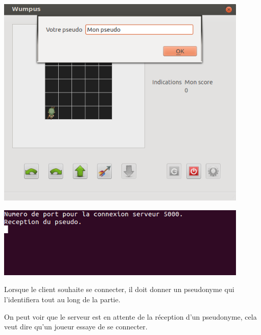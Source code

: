 \documentclass[a4paper,10pt]{article}
\begin{document}
		
		\begin{minipage}[t]{0.46\textwidth}
			\vspace{2pt}
			\centering
			\includegraphics[width=0.9\textwidth]{JeuxDEssais/Wumpus2.png}
		\end{minipage}
		\hfill
		\begin{minipage}[t]{0.46\textwidth}
			\vspace{55pt}
			\centering
			\includegraphics[width=0.9\textwidth]{JeuxDEssais/Serveur2.png}
		\end{minipage}

		\begin{minipage}[t]{0.46\textwidth}
			\vspace{2pt}
			Lorsque le client souhaite se connecter, il doit donner un pseudonyme qui l'identifiera tout au long de la partie.
		\end{minipage}
		\hfill
		\begin{minipage}[t]{0.46\textwidth}
			\vspace{2pt}
			On peut voir que le serveur est en attente de la réception d'un pseudonyme, cela veut dire qu'un joueur essaye de se connecter.
		\end{minipage}\\
\end{document}
